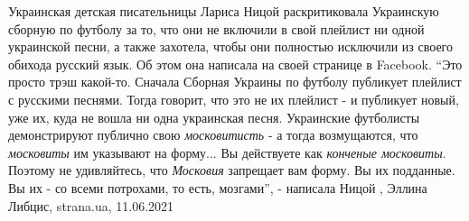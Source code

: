 Украинская детская писательницы Лариса Ницой раскритиковала Украинскую сборную
по футболу за то, что они не включили в свой плейлист ни одной украинской
песни, а также захотела, чтобы они полностью исключили из своего обихода
русский язык.  Об этом она написала на своей странице в Facebook.  \enquote{Это
просто трэш какой-то. Сначала Сборная Украины по футболу публикует плейлист с
русскими песнями. Тогда говорит, что это не их плейлист - и публикует новый,
уже их, куда не вошла ни одна украинская песня. Украинские футболисты
демонстрируют публично свою \emph{московитисть} - а тогда возмущаются, что
\emph{московиты} им указывают на форму... Вы действуете как \emph{конченые
московиты}. Поэтому не удивляйтесь, что \emph{Московия} запрещает вам форму. Вы
их подданные. Вы их - со всеми потрохами, то есть, мозгами}, - написала Ницой
, Эллина Либцис, strana.ua, 11.06.2021

